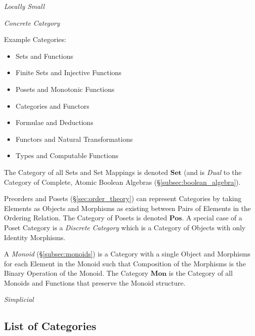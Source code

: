 \emph{Locally Small}

\emph{Concrete Category}

Example Categories:
\begin{itemize}
\item Sets and Functions
\item Finite Sets and Injective Functions
\item Posets and Monotonic Functions
\item Categories and Functors
\item Formulae and Deductions
\item Functors and Natural Transformations
\item Types and Computable Functions
\end{itemize}
The Category of all Sets and Set Mappings is denoted $\mathbf{Set}$
(and is \emph{Dual} to the Category of Complete, Atomic Boolean
Algebras (\S\ref{subsec:boolean_algebra}).

Preorders and Posets (\S\ref{sec:order_theory}) can represent
Categories by taking Elements as Objects and Morphisms as existing
between Pairs of Elements in the Ordering Relation. The Category of
Posets is denoted $\mathbf{Pos}$. A special case of a Poset Category
is a \emph{Discrete Category} which is a Category of Objects with only
Identity Morphisms.

A \emph{Monoid} (\S\ref{subsec:monoids}) is a Category with a single
Object and Morphisms for each Element in the Monoid such that
Composition of the Morphisms is the Binary Operation of the
Monoid. The Category $\mathbf{Mon}$ is the Category of all Monoids and
Functions that preserve the Monoid structure.

\emph{Simplicial}

\subsection{List of Categories}\label{subsec:categories_list}

